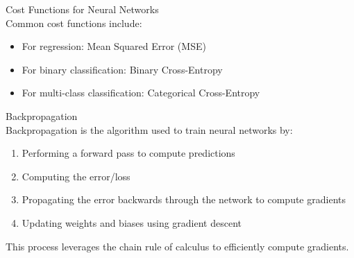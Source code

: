 \begin{definition}{Cost Functions for Neural Networks}\\
Common cost functions include:
\begin{itemize}
    \item For regression: Mean Squared Error (MSE)
    \item For binary classification: Binary Cross-Entropy
    \item For multi-class classification: Categorical Cross-Entropy
\end{itemize}
\end{definition}

\begin{definition}{Backpropagation}\\
Backpropagation is the algorithm used to train neural networks by:
\begin{enumerate}
    \item Performing a forward pass to compute predictions
    \item Computing the error/loss
    \item Propagating the error backwards through the network to compute gradients
    \item Updating weights and biases using gradient descent
\end{enumerate}
This process leverages the chain rule of calculus to efficiently compute gradients.
\end{definition}

